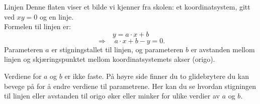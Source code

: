 \begin{surferPage}{Linjen}
Denne flaten viser et bilde vi kjenner fra skolen: et koordinatsystem, gitt ved $xy=0$ og en linje. \\Formelen til linjen er:
\[y=a\cdot x + b\]
\[ \Rightarrow \quad a\cdot x +b -y=0.\]
Parameteren $a$ er stigningstallet til linjen, og parameteren $b$ er avstanden mellom linjen og skjæringspunktet mellom koordinatsystemets akser (origo). 
\newline

Verdiene for $a$ og $b$ er ikke faste. På høyre side finner du to glidebrytere du kan bevege på 
for å endre verdiene til parametrene. Her kan du se hvordan stigningen til linjen eller avstanden 
til origo øker eller minker for ulike verdier av $a$ og $b$.
\end{surferPage}
